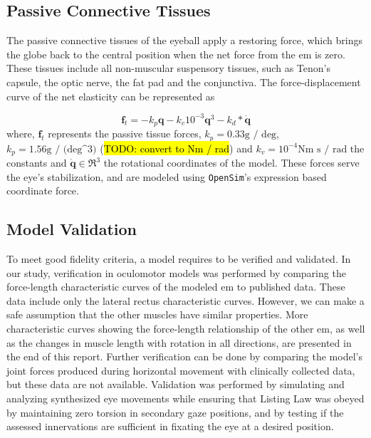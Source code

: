 \documentclass[11pt,a4paper,draft=false]{report}
\renewcommand*{\vec}[1]{\bm{#1}}
\newcommand{\R}[1]{\mathfrak{R}^{#1}}
\newcommand{\inr}[1]{\in\R{#1}}
\begin{document}
\subsection*{Passive Connective Tissues}\label{sec:passive-connective-tissues}

The passive connective tissues of the eyeball apply a restoring force, which
brings the globe back to the central position when the net force from the
\gls{em} is zero. These tissues include all non-muscular suspensory tissues,
such as Tenon’s capsule, the optic nerve, the fat pad and the conjunctiva. The
force-displacement curve of the net elasticity can be represented as

\begin{equation}\label{equ:passive-tissue}
  \vec{f}_t = -k_p \vec{q} - k_c 10^{-3} \vec{q}^3 - k_d * \vec{\dot{q}}
\end{equation}
%
where, $\vec{f}_t$ represents the passive tissue forces,
$k_p= 0.33 \text{g / deg}$, $k_p= 1.56 \text{g / (deg^3)}$ (\hl{TODO: convert to
  Nm / rad}) and
$k_v= 10^{-4} \text{Nm s / rad}$ the constants and $\vec{\dot{q}} \inr{3}$ the
rotational coordinates of the model. These forces serve the eye’s stabilization,
and are modeled using \texttt{OpenSim}'s expression based coordinate force.

\subsection*{Model Validation}\label{sec:model-validation}

To meet good fidelity criteria, a model requires to be verified and
validated. In our study, verification in oculomotor models was performed by
comparing the force-length characteristic curves of the modeled \gls{em} to
published data. These data include only the lateral rectus characteristic
curves. However, we can make a safe assumption that the other muscles have
similar properties. More characteristic curves showing the force-length
relationship of the other \gls{em}, as well as the changes in muscle length with
rotation in all directions, are presented in the end of this report. Further
verification can be done by comparing the model’s joint forces produced during
horizontal movement with clinically collected data, but these data are not
available.  Validation was performed by simulating and analyzing synthesized eye
movements while ensuring that Listing Law was obeyed by maintaining zero torsion
in secondary gaze positions, and by testing if the assessed innervations are
sufficient in fixating the eye at a desired position.
\end{document}
